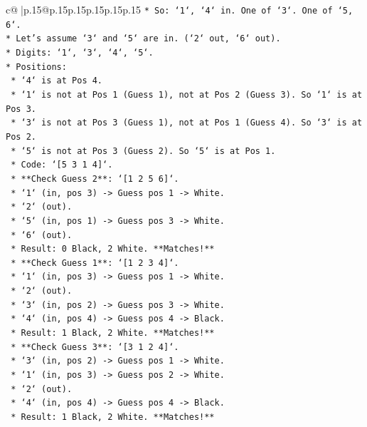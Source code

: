 \documentclass{article}
\begin{document}
{\begin{supertabular}{c@{$\;$}|p{.15\linewidth}@{}p{.15\linewidth}p{.15\linewidth}p{.15\linewidth}p{.15\linewidth}p{.15\linewidth}}
{{{\texttt{*   So: `1`, `4` in. One of `3`. One of `5, 6`.} \\
\texttt{*   Let's assume `3` and `5` are in. (`2` out, `6` out).} \\
\texttt{*   Digits: `1`, `3`, `4`, `5`.} \\
\texttt{*   Positions:} \\
\texttt{    *   `4` is at Pos 4.} \\
\texttt{    *   `1` is not at Pos 1 (Guess 1), not at Pos 2 (Guess 3). So `1` is at Pos 3.} \\
\texttt{    *   `3` is not at Pos 3 (Guess 1), not at Pos 1 (Guess 4). So `3` is at Pos 2.} \\
\texttt{    *   `5` is not at Pos 3 (Guess 2). So `5` is at Pos 1.} \\
\texttt{    *   Code: `{[}5 3 1 4{]}`.} \\
\texttt{    *   **Check Guess 2**: `{[}1 2 5 6{]}`.} \\
\texttt{        *   `1` (in, pos 3) {-}> Guess pos 1 {-}> White.} \\
\texttt{        *   `2` (out).} \\
\texttt{        *   `5` (in, pos 1) {-}> Guess pos 3 {-}> White.} \\
\texttt{        *   `6` (out).} \\
\texttt{        *   Result: 0 Black, 2 White. **Matches!**} \\
\texttt{    *   **Check Guess 1**: `{[}1 2 3 4{]}`.} \\
\texttt{        *   `1` (in, pos 3) {-}> Guess pos 1 {-}> White.} \\
\texttt{        *   `2` (out).} \\
\texttt{        *   `3` (in, pos 2) {-}> Guess pos 3 {-}> White.} \\
\texttt{        *   `4` (in, pos 4) {-}> Guess pos 4 {-}> Black.} \\
\texttt{        *   Result: 1 Black, 2 White. **Matches!**} \\
\texttt{    *   **Check Guess 3**: `{[}3 1 2 4{]}`.} \\
\texttt{        *   `3` (in, pos 2) {-}> Guess pos 1 {-}> White.} \\
\texttt{        *   `1` (in, pos 3) {-}> Guess pos 2 {-}> White.} \\
\texttt{        *   `2` (out).} \\
\texttt{        *   `4` (in, pos 4) {-}> Guess pos 4 {-}> Black.} \\
\texttt{        *   Result: 1 Black, 2 White. **Matches!**} \\
}}}
\end{supertabular}}
\end{document}
